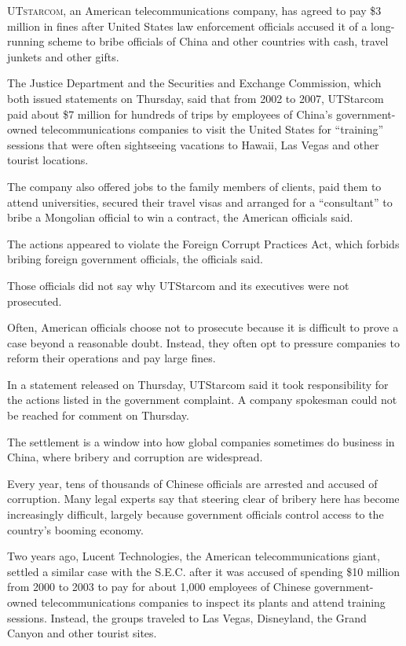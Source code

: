 ﻿\documentclass[12pt]{article}
\begin{document}
\lettrine{U}{Tstarcom}, an American telecommunications company, has agreed
to pay \$3 million in fines after United States law enforcement officials accused it of a
long-running scheme to bribe officials of China and other countries with cash, travel junkets and
other gifts.

The Justice Department and the Securities and Exchange Commission, which both issued statements on
Thursday, said that from 2002 to 2007, UTStarcom paid about \$7 million for hundreds of trips by
employees of China's government-owned telecommunications companies to visit the United States for
``training'' sessions that were often sightseeing vacations to Hawaii, Las Vegas and other tourist
locations.

The company also offered jobs to the family members of clients, paid them to attend universities,
secured their travel visas and arranged for a ``consultant'' to bribe a Mongolian official to win a
contract, the American officials said.

The actions appeared to violate the Foreign Corrupt Practices Act, which forbids bribing foreign
government officials, the officials said.

Those officials did not say why UTStarcom and its executives were not prosecuted.

Often, American officials choose not to prosecute because it is difficult to prove a case beyond a
reasonable doubt. Instead, they often opt to pressure companies to reform their operations and pay
large fines.

In a statement released on Thursday, UTStarcom said it took responsibility for the actions listed in
the government complaint. A company spokesman could not be reached for comment on Thursday.

The settlement is a window into how global companies sometimes do business in China, where bribery
and corruption are widespread.

Every year, tens of thousands of Chinese officials are arrested and accused of corruption. Many
legal experts say that steering clear of bribery here has become increasingly difficult, largely
because government officials control access to the country's booming economy.

Two years ago, Lucent Technologies, the American telecommunications giant, settled a similar case
with the S.E.C. after it was accused of spending \$10 million from 2000 to 2003 to pay for about
1,000 employees of Chinese government-owned telecommunications companies to inspect its plants and
attend training sessions. Instead, the groups traveled to Las Vegas, Disneyland, the Grand Canyon
and other tourist sites.
\end{document}
